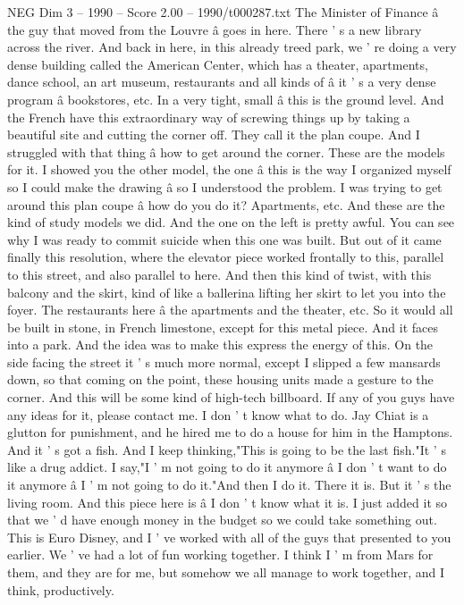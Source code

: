 \begin{textsample}{NEG Dim 3 – 1990 – Score 2.00 – 1990/t000287.txt}
The Minister of Finance â the guy that moved from the Louvre â goes in here.
There ' s a new library across the river.
And back in here, in this already treed park, we ' re doing a very dense building called the American Center, which has a theater, apartments, dance school, an art museum, restaurants and all kinds of â it ' s a very dense program â bookstores, etc.
In a very tight, small â this is the ground level.
And the French have this extraordinary way of screwing things up by taking a beautiful site and cutting the corner off.
They call it the plan coupe.
And I struggled with that thing â how to get around the corner.
These are the models for it.
I showed you the other model, the one â this is the way I organized myself so I could make the drawing â so I understood the problem.
I was trying to get around this plan coupe â how do you do it?
Apartments, etc.
And these are the kind of study models we did.
And the one on the left is pretty awful.
You can see why I was ready to commit suicide when this one was built.
But out of it came finally this resolution, where the elevator piece worked frontally to this, parallel to this street, and also parallel to here.
And then this kind of twist, with this balcony and the skirt, kind of like a ballerina lifting her skirt to let you into the foyer.
The restaurants here â the apartments and the theater, etc.
So it would all be built in stone, in French limestone, except for this metal piece.
And it faces into a park.
And the idea was to make this express the energy of this.
On the side facing the street it ' s much more normal, except I slipped a few mansards down, so that coming on the point, these housing units made a gesture to the corner.
And this will be some kind of high-tech billboard.
If any of you guys have any ideas for it, please contact me.
I don ' t know what to do.
Jay Chiat is a glutton for punishment, and he hired me to do a house for him in the Hamptons.
And it ' s got a fish.
And I keep thinking,"This is going to be the last fish."It ' s like a drug addict.
I say,"I ' m not going to do it anymore â I don ' t want to do it anymore â I ' m not going to do it."And then I do it.
There it is.
But it ' s the living room.
And this piece here is â I don ' t know what it is.
I just added it so that we ' d have enough money in the budget so we could take something out.
This is Euro Disney, and I ' ve worked with all of the guys that presented to you earlier.
We ' ve had a lot of fun working together.
I think I ' m from Mars for them, and they are for me, but somehow we all manage to work together, and I think, productively.

\end{textsample}
